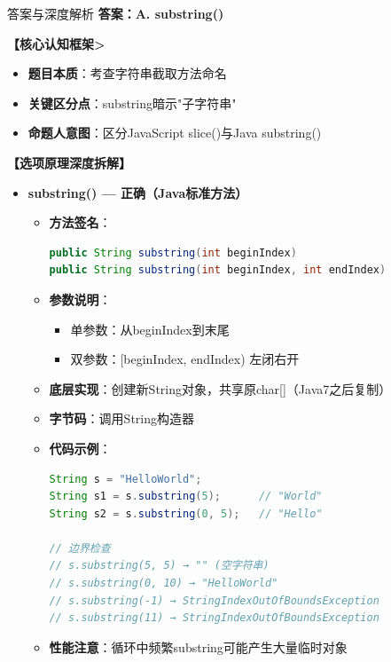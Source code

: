 \documentclass[12pt, a4paper]{ctexart}
\begin{document}
\begin{enumerate}[label=\textbf{\arabic*.}]
	      \begin{bluebox}{答案与深度解析}
		      \textbf{答案：A. substring()}

		      \textbf{【核心认知框架>}
		      \begin{itemize}[label={}, leftmargin=*, nosep]
			      \item \textbf{题目本质}：考查字符串截取方法命名
			      \item \textbf{关键区分点}：substring暗示"子字符串"
			      \item \textbf{命题人意图}：区分JavaScript slice()与Java substring()
		      \end{itemize}

		      \textbf{【选项原理深度拆解】}

		      \begin{itemize}[leftmargin=*, nosep, label={}]
			      \item[A] \textbf{substring() — 正确（Java标准方法）}
			            \begin{itemize}[label={}, leftmargin=*, nosep]
				            \item \textbf{方法签名}：
				                  \begin{lstlisting}[language=Java]
public String substring(int beginIndex)
public String substring(int beginIndex, int endIndex)
				            \end{lstlisting}
				            \item \textbf{参数说明}：
				                  \begin{itemize}[label={}, nosep]
					                  \item 单参数：从beginIndex到末尾
					                  \item 双参数：[beginIndex, endIndex) 左闭右开
				                  \end{itemize}
				            \item \textbf{底层实现}：创建新String对象，共享原char[]（Java7之后复制）
				            \item \textbf{字节码}：调用String构造器
				            \item \textbf{代码示例}：
				                  \begin{lstlisting}[language=Java]
String s = "HelloWorld";
String s1 = s.substring(5);      // "World"
String s2 = s.substring(0, 5);   // "Hello"

// 边界检查
// s.substring(5, 5) → "" (空字符串)
// s.substring(0, 10) → "HelloWorld"
// s.substring(-1) → StringIndexOutOfBoundsException
// s.substring(11) → StringIndexOutOfBoundsException
				            \end{lstlisting}
				            \item \textbf{性能注意}：循环中频繁substring可能产生大量临时对象
			            \end{itemize}


\end{itemize}
\end{bluebox}
\end{enumerate}
\end{document}

